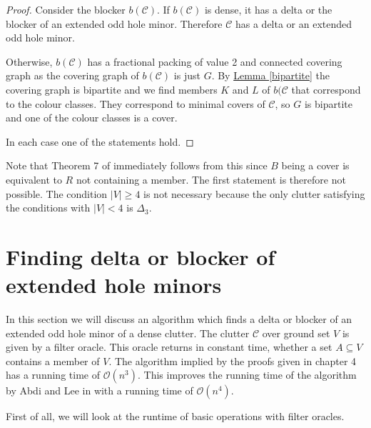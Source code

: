\documentclass[a4paper, 12pt]{scrbook}
\theoremstyle{definition}
\begin{document}
   \begin{proof}
       Consider the blocker $b(\mathcal{C})$.
       If $b(\mathcal{C})$ is dense, it has a delta or the blocker of an extended odd hole minor.
       Therefore $\mathcal{C}$ has a delta or an extended odd hole minor.

       Otherwise, $b(\mathcal{C})$ has a fractional packing of value 2 and connected covering graph as the covering graph of $b(\mathcal{C})$ is just $G$.
       By \hyperref[bipartite]{Lemma \ref*{bipartite}} the covering graph is bipartite and we find members $K$ and $L$ of $b(\mathcal{C}$ that correspond to the colour classes. They correspond to minimal covers of $\mathcal{C}$, so $G$ is bipartite and one of the colour classes is a cover.

       In each case one of the statements hold.
   \end{proof}

   Note that Theorem 7 of \cite{deltas} immediately follows from this since $B$ being a cover is equivalent to $R$ not containing a member. The first statement is therefore not possible. The condition $|V|\geq 4$ is not necessary because the only clutter satisfying the conditions with $|V|<4$ is $\Delta_3$.

   \chapter{Finding delta or blocker of extended hole minors}
   In this section we will discuss an algorithm which finds a delta or blocker of an extended odd hole minor of a dense clutter.
   The clutter $\mathcal{C}$ over ground set $V$ is given by a filter oracle.
   This oracle returns in constant time, whether a set $A \subseteq V$ contains a member of $V$.
   The algorithm implied by the proofs given in chapter 4 has a running time of $\mathcal{O}(n^3)$.
   This improves the running time of the algorithm by Abdi and Lee in \cite{deltas} with a running time of $\mathcal{O}(n^4)$.


   First of all, we will look at the runtime of basic operations with filter oracles.
\end{document}
